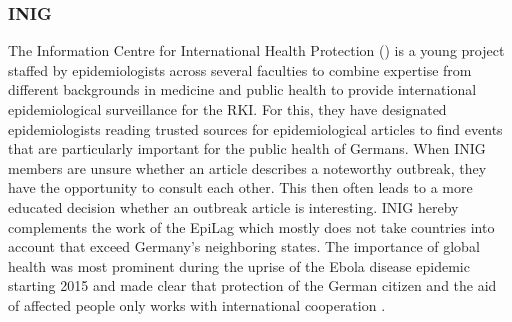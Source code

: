 \subsubsection{INIG}
The Information Centre for International Health Protection () is a young project staffed by epidemiologists across several faculties to combine expertise from different backgrounds in medicine and public health to provide international epidemiological surveillance for the RKI. For this, they have designated epidemiologists reading trusted sources for epidemiological articles to find events that are particularly important for the public health of Germans. When INIG members are unsure whether an article describes a noteworthy outbreak, they have the opportunity to consult each other. This then often leads to a more educated decision whether an outbreak article is interesting. INIG hereby complements the work of the EpiLag which mostly does not take countries into account that exceed Germany's neighboring states. The importance of global health was most prominent during the uprise of the Ebola disease epidemic starting 2015 and made clear that protection of the German citizen and the aid of affected people only works with international cooperation \cite{Grohe2017}.

